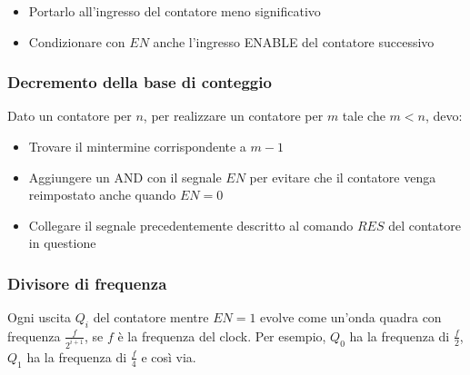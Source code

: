 \documentclass{subfiles}
\begin{document}
\begin{itemize}
    \item Portarlo all'ingresso del contatore meno significativo
    \item Condizionare con $EN$ anche l'ingresso ENABLE del contatore successivo
\end{itemize}

\subsubsection{Decremento della base di conteggio}

Dato un contatore per $n$, per realizzare un contatore per $m$ tale che $m < n$, devo:

\begin{itemize}
    \item Trovare il mintermine corrispondente a $m-1$
    \item Aggiungere un AND con il segnale $EN$ per evitare che il contatore venga reimpostato anche quando $EN=0$
    \item Collegare il segnale precedentemente descritto al comando $RES$ del contatore in questione
\end{itemize}

\subsubsection{Divisore di frequenza}

Ogni uscita $Q_i$ del contatore mentre $EN=1$ evolve come un'onda quadra con frequenza $\frac{f}{2^{i+1}}$, se $f$ è la frequenza del clock.
Per esempio, $Q_0$ ha la frequenza di $\frac{f}{2}$, $Q_1$ ha la frequenza di $\frac{f}{4}$ e così via.
\end{document}

